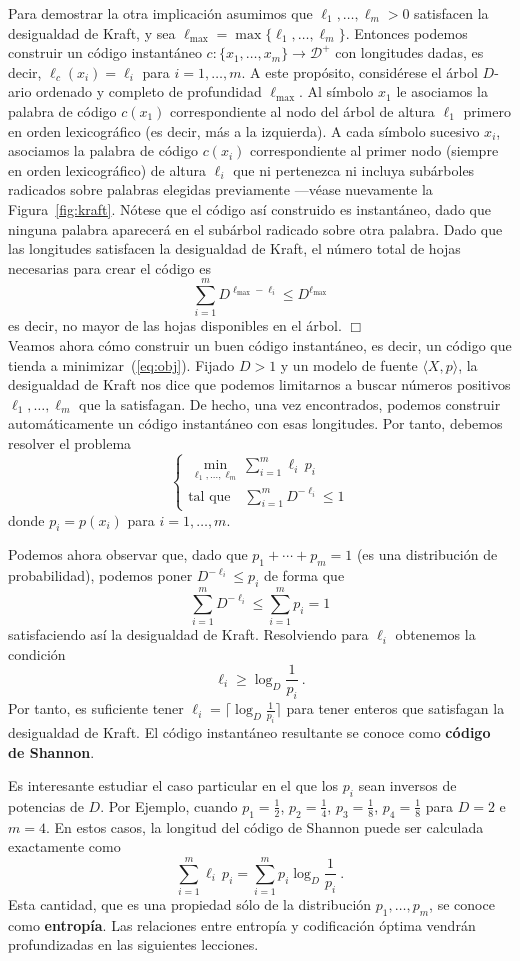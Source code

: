 \documentclass[11pt]{article}
\newenvironment{proof}{{\textsc{Demostración.}\ }}{\hfill$\Box$\\[2mm]}
\newcommand{\scD}{\mathcal{D}}
\newcommand{\lmax}{\ell_{\textrm{max}}}
\newcommand{\dt}{\displaystyle}
\begin{document}
\begin{proof}
Para demostrar la otra implicación asumimos que $\ell_1,\dots,\ell_m > 0$ satisfacen la desigualdad de Kraft, y sea $\lmax = \max\{\ell_1,\dots,\ell_m\}$. Entonces podemos construir un código instantáneo $c : \{x_1,\dots,x_m\} \to \scD^+$ con longitudes dadas, es decir, $\ell_c(x_i) = \ell_i$ para $i=1,\dots,m$. A este propósito, considérese el árbol $D$-ario ordenado y completo de profundidad $\lmax$. Al símbolo $x_1$ le asociamos la palabra de código $c(x_1)$ correspondiente al nodo del árbol de altura $\ell_1$ primero en orden lexicográfico (es decir, más a la izquierda). A cada símbolo sucesivo $x_i$, asociamos la palabra de código $c(x_i)$ correspondiente al primer nodo (siempre en orden lexicográfico) de altura $\ell_i$ que ni pertenezca ni incluya subárboles radicados sobre palabras elegidas previamente ---véase nuevamente la Figura~\ref{fig:kraft}. Nótese que el código así construido es instantáneo, dado que ninguna palabra aparecerá en el subárbol radicado sobre otra palabra. Dado que las longitudes satisfacen la desigualdad de Kraft, el número total de hojas necesarias para crear el código es
\[
    \sum_{i=1}^m D^{\lmax-\ell_i} \le D^{\lmax}
\]
es decir, no mayor de las hojas disponibles en el árbol.
\end{proof}
Veamos ahora cómo construir un buen código instantáneo, es decir, un código que tienda a minimizar~(\ref{eq:obj}). Fijado $D > 1$ y un modelo de fuente $\langle X,p \rangle$, la desigualdad de Kraft nos dice que podemos limitarnos a buscar números positivos $\ell_1,\dots,\ell_m$ que la satisfagan. De hecho, una vez encontrados, podemos construir automáticamente un código instantáneo con esas longitudes. Por tanto, debemos resolver el problema
\[
    \left\{ \begin{array}{l}
       {\dt \min_{\ell_1,\dots,\ell_m} \sum_{i=1}^m \ell_i\,p_i }
    \\[2mm]
        \text{tal que} {\dt \quad \sum_{i=1}^m D^{-\ell_i} \le 1 }
    \end{array} \right.
\]
donde $p_i = p(x_i)$ para $i=1,\dots,m$.
 
Podemos ahora observar que, dado que $p_1+\cdots+p_m = 1$ (es una distribución de probabilidad), podemos poner $D^{-\ell_i} \le p_i$ de forma que
\[
    \sum_{i=1}^m D^{-\ell_i} \le \sum_{i=1}^m p_i = 1
\]
satisfaciendo así la desigualdad de Kraft. Resolviendo para $\ell_i$ obtenemos la condición
\[
    \ell_i \ge \log_D\frac{1}{p_i}~.
\]
Por tanto, es suficiente tener $\ell_i = \bigl\lceil \log_D\tfrac{1}{p_i} \bigr\rceil$ para tener enteros que satisfagan la desigualdad de Kraft. El código instantáneo resultante se conoce como \textbf{código de Shannon}.

Es interesante estudiar el caso particular en el que los $p_i$ sean inversos de potencias de $D$. Por Ejemplo, cuando $p_1 = \tfrac{1}{2}$, $p_2 = \tfrac{1}{4}$, $p_3 = \tfrac{1}{8}$, $p_4 = \tfrac{1}{8}$ para $D=2$ e $m=4$. En estos casos, la longitud del código de Shannon puede ser calculada exactamente como
\[
    \sum_{i=1}^m \ell_i\,p_i = \sum_{i=1}^m p_i\log_D\frac{1}{p_i}~.
\]
Esta cantidad, que es una propiedad sólo de la distribución $p_1,\dots,p_m$, se conoce como \textbf{entropía}. Las relaciones entre entropía y codificación óptima vendrán profundizadas en las siguientes lecciones.
\end{document}
